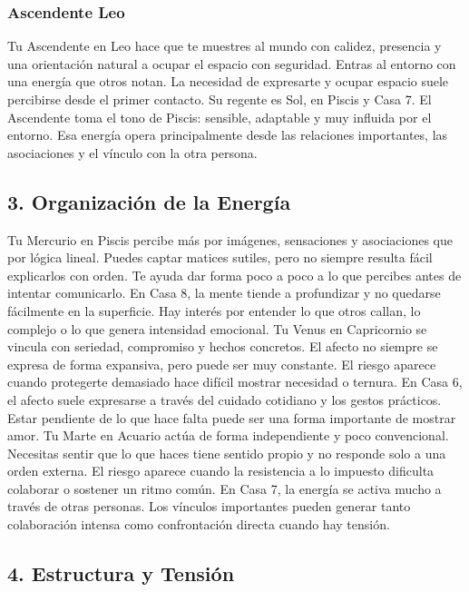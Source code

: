 \documentclass[11pt,a4paper]{article}
\begin{document}
\subsubsection*{Ascendente Leo}
Tu Ascendente en Leo hace que te muestres al mundo con calidez, presencia y una orientación natural a ocupar el espacio con seguridad. Entras al entorno con una energía que otros notan. La necesidad de expresarte y ocupar espacio suele percibirse desde el primer contacto. Su regente es Sol, en Piscis y Casa 7. El Ascendente toma el tono de Piscis: sensible, adaptable y muy influida por el entorno. Esa energía opera principalmente desde las relaciones importantes, las asociaciones y el vínculo con la otra persona.


\subsection{3. Organización de la Energía}

Tu Mercurio en Piscis percibe más por imágenes, sensaciones y asociaciones que por lógica lineal. Puedes captar matices sutiles, pero no siempre resulta fácil explicarlos con orden. Te ayuda dar forma poco a poco a lo que percibes antes de intentar comunicarlo. En Casa 8, la mente tiende a profundizar y no quedarse fácilmente en la superficie. Hay interés por entender lo que otros callan, lo complejo o lo que genera intensidad emocional. Tu Venus en Capricornio se vincula con seriedad, compromiso y hechos concretos. El afecto no siempre se expresa de forma expansiva, pero puede ser muy constante. El riesgo aparece cuando protegerte demasiado hace difícil mostrar necesidad o ternura. En Casa 6, el afecto suele expresarse a través del cuidado cotidiano y los gestos prácticos. Estar pendiente de lo que hace falta puede ser una forma importante de mostrar amor. Tu Marte en Acuario actúa de forma independiente y poco convencional. Necesitas sentir que lo que haces tiene sentido propio y no responde solo a una orden externa. El riesgo aparece cuando la resistencia a lo impuesto dificulta colaborar o sostener un ritmo común. En Casa 7, la energía se activa mucho a través de otras personas. Los vínculos importantes pueden generar tanto colaboración intensa como confrontación directa cuando hay tensión.

\subsection{4. Estructura y Tensión}
\end{document}
